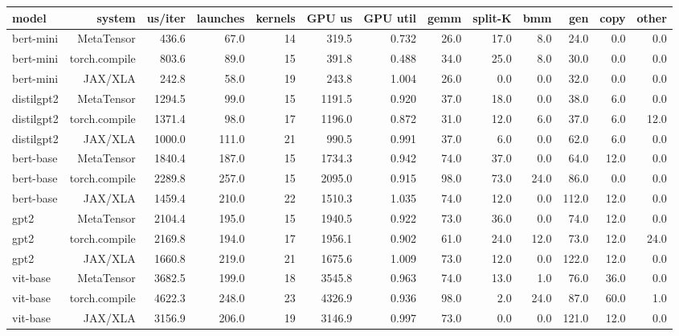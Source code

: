 \begin{tabular}{lrrrrrrrrrrrr}
\toprule
model & system & us/iter & launches & kernels & GPU us & GPU util & gemm & split-K & bmm & gen & copy & other \\
\midrule
bert-mini & MetaTensor & 436.6 & 67.0 & 14 & 319.5 & 0.732 & 26.0 & 17.0 & 8.0 & 24.0 & 0.0 & 0.0 \\
bert-mini & torch.compile & 803.6 & 89.0 & 15 & 391.8 & 0.488 & 34.0 & 25.0 & 8.0 & 30.0 & 0.0 & 0.0 \\
bert-mini & JAX/XLA & 242.8 & 58.0 & 19 & 243.8 & 1.004 & 26.0 & 0.0 & 0.0 & 32.0 & 0.0 & 0.0 \\
distilgpt2 & MetaTensor & 1294.5 & 99.0 & 15 & 1191.5 & 0.920 & 37.0 & 18.0 & 0.0 & 38.0 & 6.0 & 0.0 \\
distilgpt2 & torch.compile & 1371.4 & 98.0 & 17 & 1196.0 & 0.872 & 31.0 & 12.0 & 6.0 & 37.0 & 6.0 & 12.0 \\
distilgpt2 & JAX/XLA & 1000.0 & 111.0 & 21 & 990.5 & 0.991 & 37.0 & 6.0 & 0.0 & 62.0 & 6.0 & 0.0 \\
bert-base & MetaTensor & 1840.4 & 187.0 & 15 & 1734.3 & 0.942 & 74.0 & 37.0 & 0.0 & 64.0 & 12.0 & 0.0 \\
bert-base & torch.compile & 2289.8 & 257.0 & 15 & 2095.0 & 0.915 & 98.0 & 73.0 & 24.0 & 86.0 & 0.0 & 0.0 \\
bert-base & JAX/XLA & 1459.4 & 210.0 & 22 & 1510.3 & 1.035 & 74.0 & 12.0 & 0.0 & 112.0 & 12.0 & 0.0 \\
gpt2 & MetaTensor & 2104.4 & 195.0 & 15 & 1940.5 & 0.922 & 73.0 & 36.0 & 0.0 & 74.0 & 12.0 & 0.0 \\
gpt2 & torch.compile & 2169.8 & 194.0 & 17 & 1956.1 & 0.902 & 61.0 & 24.0 & 12.0 & 73.0 & 12.0 & 24.0 \\
gpt2 & JAX/XLA & 1660.8 & 219.0 & 21 & 1675.6 & 1.009 & 73.0 & 12.0 & 0.0 & 122.0 & 12.0 & 0.0 \\
vit-base & MetaTensor & 3682.5 & 199.0 & 18 & 3545.8 & 0.963 & 74.0 & 13.0 & 1.0 & 76.0 & 36.0 & 0.0 \\
vit-base & torch.compile & 4622.3 & 248.0 & 23 & 4326.9 & 0.936 & 98.0 & 2.0 & 24.0 & 87.0 & 60.0 & 1.0 \\
vit-base & JAX/XLA & 3156.9 & 206.0 & 19 & 3146.9 & 0.997 & 73.0 & 0.0 & 0.0 & 121.0 & 12.0 & 0.0 \\
\bottomrule
\end{tabular}
